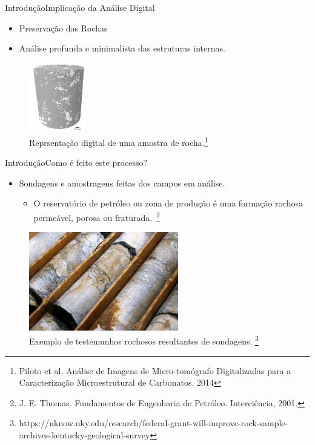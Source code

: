 \documentclass{beamer}
\begin{document}
\begin{frame}{Introdução}{Implicação da Análise Digital}

\begin{itemize}
    \item Preservação das Rochas
    \item Análise profunda e minimalista das estruturas internas.
    
\end{itemize}

\begin{figure}[!htb]
\centering
\includegraphics[width=2.5cm]{fig/amostra3d} \\
{\scriptsize Reprsentação digital de uma amostra de rocha.\protect\footnote{Piloto et al. Análise de Imagens de Micro-tomógrafo Digitalizadas para a Caracterização Microestrutural de Carbonatos. 2014}}
\end{figure}

\end{frame}


\begin{frame}{Introdução}{Como é feito este processo?}
    \begin{itemize}
        \item Sondagens e amostragens feitas dos campos em análise.
        \begin{itemize}
            \item O reservatório de petróleo ou zona de produção é uma formação rochosa permeável, porosa ou fraturada.~\protect\footnote{J. E. Thomas. Fundamentos de Engenharia de Petróleo. Interciência, 2001.}
        \end{itemize}
    \end{itemize}
    
    \begin{figure}[!htb]
        \centering
        \includegraphics[width=6.5cm]{fig/testemunho.jpg}\\
        {\scriptsize Exemplo de testemunhos rochosos resultantes de sondagens. \protect\footnote{https://uknow.uky.edu/research/federal-grant-will-improve-rock-sample-archives-kentucky-geological-survey}}
    \end{figure}
\end{frame}
\end{document}
